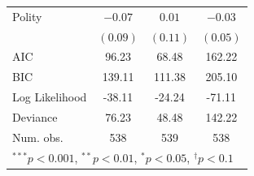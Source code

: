 \documentclass[12pt,]{book}
\let\origtable\table
\let\endorigtable\endtable
\renewenvironment{table}[1][2] {
    \singlespacing
    \expandafter\origtable\expandafter[H]
} {
    \endorigtable
}
\theoremstyle{definition}
\theoremstyle{definition}
\theoremstyle{definition}
\theoremstyle{remark}
\begin{document}
\begin{table}
\begin{center}
\begin{tabular}{l c c c }
Polity                            & $-0.07$           & $0.01$    & $-0.03$  \\
                                  & $(0.09)$          & $(0.11)$  & $(0.05)$ \\
\hline
AIC                               & 96.23             & 68.48     & 162.22   \\
BIC                               & 139.11            & 111.38    & 205.10   \\
Log Likelihood                    & -38.11            & -24.24    & -71.11   \\
Deviance                          & 76.23             & 48.48     & 142.22   \\
Num. obs.                         & 538               & 539       & 538      \\
\hline
\multicolumn{4}{l}{\scriptsize{$^{***}p<0.001$, $^{**}p<0.01$, $^*p<0.05$, $^{\dagger}p<0.1$}}
\end{tabular}
\caption{Rare Events Logit Models of Alliance Formation (Central Govt Conflicts Only)}
\label{tab:alliance-gov}
\end{center}
\end{table}
\end{document}
